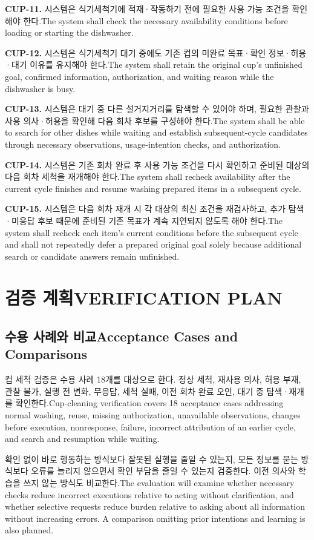 \documentclass[conference,a4paper]{IEEEtran}
\newcommand{\bi}[2]{\ifKorean#1\else#2\fi}
\newcommand{\req}[3]{\par\noindent\textbf{#1.} \bi{#2}{#3}\par\smallskip}
\begin{document}
\req{CUP-11}{시스템은 식기세척기에 적재·작동하기 전에 필요한 사용 가능 조건을 확인해야 한다.}{The system shall check the necessary availability conditions before loading or starting the dishwasher.}
\req{CUP-12}{시스템은 식기세척기 대기 중에도 기존 컵의 미완료 목표·확인 정보·허용·대기 이유를 유지해야 한다.}{The system shall retain the original cup's unfinished goal, confirmed information, authorization, and waiting reason while the dishwasher is busy.}
\req{CUP-13}{시스템은 대기 중 다른 설거지거리를 탐색할 수 있어야 하며, 필요한 관찰과 사용 의사·허용을 확인해 다음 회차 후보를 구성해야 한다.}{The system shall be able to search for other dishes while waiting and establish subsequent-cycle candidates through necessary observations, usage-intention checks, and authorization.}
\req{CUP-14}{시스템은 기존 회차 완료 후 사용 가능 조건을 다시 확인하고 준비된 대상의 다음 회차 세척을 재개해야 한다.}{The system shall recheck availability after the current cycle finishes and resume washing prepared items in a subsequent cycle.}
\req{CUP-15}{시스템은 다음 회차 재개 시 각 대상의 최신 조건을 재검사하고, 추가 탐색·미응답 후보 때문에 준비된 기존 목표가 계속 지연되지 않도록 해야 한다.}{The system shall recheck each item's current conditions before the subsequent cycle and shall not repeatedly defer a prepared original goal solely because additional search or candidate answers remain unfinished.}
\section{\bi{검증 계획}{VERIFICATION PLAN}}
\subsection{\bi{수용 사례와 비교}{Acceptance Cases and Comparisons}}
\bi{컵 세척 검증은 수용 사례 18개를 대상으로 한다. 정상 세척, 재사용 의사, 허용 부재, 관찰 불가, 실행 전 변화, 무응답, 세척 실패, 이전 회차 완료 오인, 대기 중 탐색·재개를 확인한다.}{Cup-cleaning verification covers 18 acceptance cases addressing normal washing, reuse, missing authorization, unavailable observations, changes before execution, nonresponse, failure, incorrect attribution of an earlier cycle, and search and resumption while waiting.}

\bi{확인 없이 바로 행동하는 방식보다 잘못된 실행을 줄일 수 있는지, 모든 정보를 묻는 방식보다 오류를 늘리지 않으면서 확인 부담을 줄일 수 있는지 검증한다. 이전 의사와 학습을 쓰지 않는 방식도 비교한다.}{The evaluation will examine whether necessary checks reduce incorrect executions relative to acting without clarification, and whether selective requests reduce burden relative to asking about all information without increasing errors. A comparison omitting prior intentions and learning is also planned.}
\end{document}
